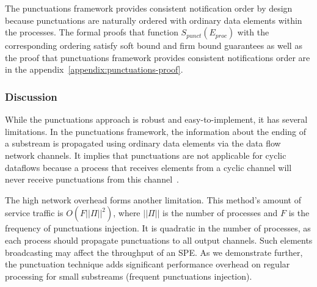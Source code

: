 The punctuations framework provides consistent notification order by design because punctuations are naturally ordered with ordinary data elements within the processes. The formal proofs that function $S_{punct}(E_{proc})$ with the corresponding ordering satisfy soft bound and firm bound guarantees as well as the proof that punctuations framework provides consistent notifications order are in the appendix~\ref{appendix:punctuations-proof}.

\subsubsection{Discussion}

While the punctuations approach is robust and easy-to-implement, it has several limitations. In the punctuations framework, the information about the ending of a substream is propagated using ordinary data elements via the data flow network channels. It implies that punctuations are not applicable for cyclic dataflows because a process that receives elements from a cyclic channel will never receive punctuations from this channel~\cite{carbone2018scalable}.

The high network overhead forms another limitation. This method's amount of service traffic is $O(F||\Pi||^2)$, where $||\Pi||$ is the number of processes and $F$ is the frequency of punctuations injection. It is quadratic in the number of processes, as each process should propagate punctuations to all output channels. Such elements broadcasting may affect the throughput of an SPE. As we demonstrate further, the punctuation technique adds significant performance overhead on regular processing for small substreams (frequent punctuations injection).